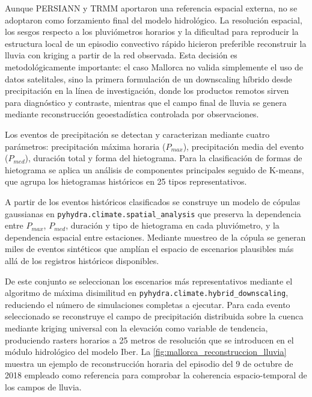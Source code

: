 Aunque PERSIANN y TRMM aportaron una referencia espacial externa, no se adoptaron como forzamiento final del modelo hidrológico. La resolución espacial, los sesgos respecto a los pluviómetros horarios y la dificultad para reproducir la estructura local de un episodio convectivo rápido hicieron preferible reconstruir la lluvia con kriging a partir de la red observada. Esta decisión es metodológicamente importante: el caso Mallorca no valida simplemente el uso de datos satelitales, sino la primera formulación de un downscaling híbrido desde precipitación en la línea de investigación, donde los productos remotos sirven para diagnóstico y contraste, mientras que el campo final de lluvia se genera mediante reconstrucción geoestadística controlada por observaciones.

Los eventos de precipitación se detectan y caracterizan mediante cuatro parámetros: precipitación máxima horaria ($P_{max}$), precipitación media del evento ($P_{med}$), duración total y forma del hietograma. Para la clasificación de formas de hietograma se aplica un análisis de componentes principales seguido de K-means, que agrupa los hietogramas históricos en 25 tipos representativos.

A partir de los eventos históricos clasificados se construye un modelo de cópulas gaussianas en \texttt{pyhydra.climate.spatial\_analysis} que preserva la dependencia entre $P_{max}$, $P_{med}$, duración y tipo de hietograma en cada pluviómetro, y la dependencia espacial entre estaciones. Mediante muestreo de la cópula se generan miles de eventos sintéticos que amplían el espacio de escenarios plausibles más allá de los registros históricos disponibles.

De este conjunto se seleccionan los escenarios más representativos mediante el algoritmo de máxima disimilitud en \texttt{pyhydra.climate.hybrid\_downscaling}, reduciendo el número de simulaciones completas a ejecutar. Para cada evento seleccionado se reconstruye el campo de precipitación distribuida sobre la cuenca mediante kriging universal con la elevación como variable de tendencia, produciendo rasters horarios a 25 metros de resolución que se introducen en el módulo hidrológico del modelo Iber. La \cref{fig:mallorca_reconstruccion_lluvia} muestra un ejemplo de reconstrucción horaria del episodio del 9 de octubre de 2018 empleado como referencia para comprobar la coherencia espacio-temporal de los campos de lluvia.

